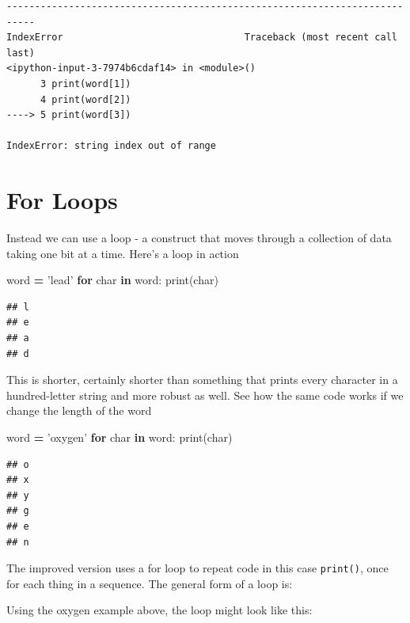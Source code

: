 \documentclass[]{book}
\newenvironment{Shaded}{\begin{snugshade}}{\end{snugshade}}
\newcommand{\BuiltInTok}[1]{#1}
\newcommand{\ControlFlowTok}[1]{\textcolor[rgb]{0.13,0.29,0.53}{\textbf{#1}}}
\newcommand{\KeywordTok}[1]{\textcolor[rgb]{0.13,0.29,0.53}{\textbf{#1}}}
\newcommand{\NormalTok}[1]{#1}
\newcommand{\OperatorTok}[1]{\textcolor[rgb]{0.81,0.36,0.00}{\textbf{#1}}}
\newcommand{\StringTok}[1]{\textcolor[rgb]{0.31,0.60,0.02}{#1}}
\theoremstyle{definition}
\theoremstyle{definition}
\theoremstyle{definition}
\theoremstyle{remark}
\begin{document}
\begin{verbatim}
---------------------------------------------------------------------------
IndexError                                Traceback (most recent call last)
<ipython-input-3-7974b6cdaf14> in <module>()
      3 print(word[1])
      4 print(word[2])
----> 5 print(word[3])

IndexError: string index out of range
\end{verbatim}

\hypertarget{for-loops}{%
\section{For Loops}\label{for-loops}}

Instead we can use a loop - a construct that moves through a collection
of data taking one bit at a time. Here's a loop in action

\begin{Shaded}
\begin{Highlighting}[]
\NormalTok{word }\OperatorTok{=} \StringTok{'lead'}
\ControlFlowTok{for}\NormalTok{ char }\KeywordTok{in}\NormalTok{ word:}
    \BuiltInTok{print}\NormalTok{(char)}
\end{Highlighting}
\end{Shaded}

\begin{verbatim}
## l
## e
## a
## d
\end{verbatim}

This is shorter, certainly shorter than something that prints every
character in a hundred-letter string and more robust as well. See how
the same code works if we change the length of the word

\begin{Shaded}
\begin{Highlighting}[]
\NormalTok{word }\OperatorTok{=} \StringTok{'oxygen'}
\ControlFlowTok{for}\NormalTok{ char }\KeywordTok{in}\NormalTok{ word:}
    \BuiltInTok{print}\NormalTok{(char)}
\end{Highlighting}
\end{Shaded}

\begin{verbatim}
## o
## x
## y
## g
## e
## n
\end{verbatim}

The improved version uses a for loop to repeat code in this case
\texttt{print()}, once for each thing in a sequence. The general form of
a loop is:

Using the oxygen example above, the loop might look like this:
\end{document}
